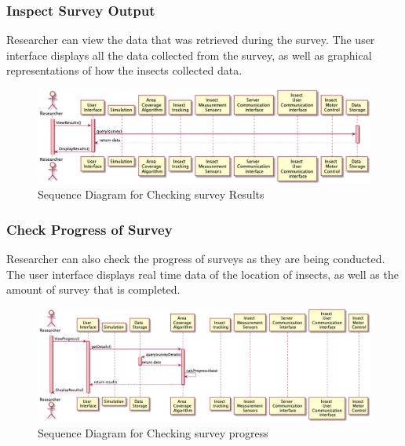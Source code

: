 \documentclass[11pt]{article}
\begin{document}
\subsubsection{Inspect Survey Output}
Researcher can view the data that was retrieved during the survey. The user interface displays all the data collected from the survey, as well as graphical representations of how the insects collected data.
\begin{figure}[H]
   \centering
   \includegraphics[width=\textwidth]{diagram/outputsequence.png}
   \caption{Sequence Diagram for Checking survey Results}
   \label{fig:stop}
\end{figure}


\subsubsection{Check Progress of Survey}
Researcher can also check the progress of surveys as they are being conducted. The user interface displays real time data of the location of insects, as well as the amount of survey that is completed.
\begin{figure}[H]
   \centering
   \includegraphics[width=\textwidth]{diagram/checksequence.png}
   \caption{Sequence Diagram for Checking survey progress}
   \label{fig:stop}
\end{figure}
\end{document}
